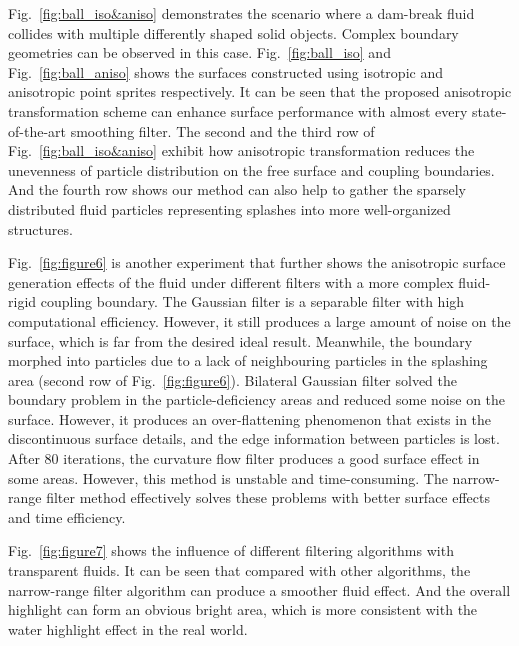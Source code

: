 \documentclass[times,twocolumn,final]{elsarticle}
\begin{document}

Fig.~\ref{fig:ball_iso&aniso} demonstrates the scenario where a dam-break fluid collides with multiple differently shaped solid objects. Complex boundary geometries can be observed in this case. Fig.~\ref{fig:ball_iso} and Fig.~\ref{fig:ball_aniso} shows the surfaces constructed using isotropic and anisotropic point sprites respectively. It can be seen that the proposed anisotropic transformation scheme can enhance surface performance with almost every state-of-the-art smoothing filter. The second and the third row of Fig.~\ref{fig:ball_iso&aniso} exhibit how anisotropic transformation reduces the unevenness of particle distribution on the free surface and coupling boundaries. And the fourth row shows our method can also help to gather the sparsely distributed fluid particles representing splashes into more well-organized structures.

Fig.~\ref{fig:figure6} is another experiment that further shows the anisotropic surface generation effects of the fluid under different filters with a more complex fluid-rigid coupling boundary. The Gaussian filter is a separable filter with high computational efficiency. However, it still produces a large amount of noise on the surface, which is far from the desired ideal result. Meanwhile, the boundary morphed into particles due to a lack of neighbouring particles in the splashing area (second row of Fig.~\ref{fig:figure6}). Bilateral Gaussian filter solved the boundary problem in the particle-deficiency areas and reduced some noise on the surface. However, it produces an over-flattening phenomenon that exists in the discontinuous surface details, and the edge information between particles is lost. After 80 iterations, the curvature flow filter produces a good surface effect in some areas. However, this method is unstable and time-consuming. The narrow-range filter method effectively solves these problems with better surface effects and time efficiency.

Fig.~\ref{fig:figure7} shows the influence of different filtering algorithms with transparent fluids. It can be seen that compared with other algorithms, the narrow-range filter algorithm can produce a smoother fluid effect. And the overall highlight can form an obvious bright area, which is more consistent with the water highlight effect in the real world.
\end{document}
